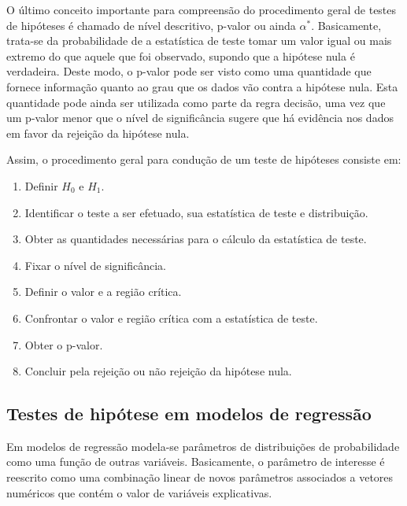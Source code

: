 O último conceito importante para compreensão do procedimento geral de  testes de hipóteses é chamado de nível descritivo, p-valor ou ainda $\alpha^*$. Basicamente, trata-se da probabilidade de a estatística de teste tomar um valor igual ou mais extremo do que aquele que foi observado, supondo que a hipótese nula é verdadeira. Deste modo, o p-valor pode ser visto como uma quantidade que fornece informação quanto ao grau que os dados vão contra a hipótese nula. Esta quantidade pode ainda ser utilizada como parte da regra decisão, uma vez que um p-valor menor que o nível de significância sugere que há evidência nos dados em favor da rejeição da hipótese nula.

Assim, o procedimento geral para condução de um teste de hipóteses 
consiste em: 

\begin{enumerate}
  
  \item Definir $H_0$ e $H_1$.
  
  \item Identificar o teste a ser efetuado, sua estatística de teste e 
distribuição.
  
  \item Obter as quantidades necessárias para o cálculo da estatística de teste.
  
  \item Fixar o nível de significância.
  
  \item Definir o valor e a região crítica.
  
  \item Confrontar o valor e região crítica com a estatística de teste.
  
  \item Obter o p-valor.
  
  \item Concluir pela rejeição ou não rejeição da hipótese nula.
  
\end{enumerate}

\subsection{Testes de hipótese em modelos de regressão}

Em modelos de regressão modela-se parâmetros de distribuições de probabilidade como uma função de outras variáveis. Basicamente, o parâmetro de interesse é reescrito como uma combinação linear de novos parâmetros associados a vetores numéricos que contém o valor de variáveis explicativas.


